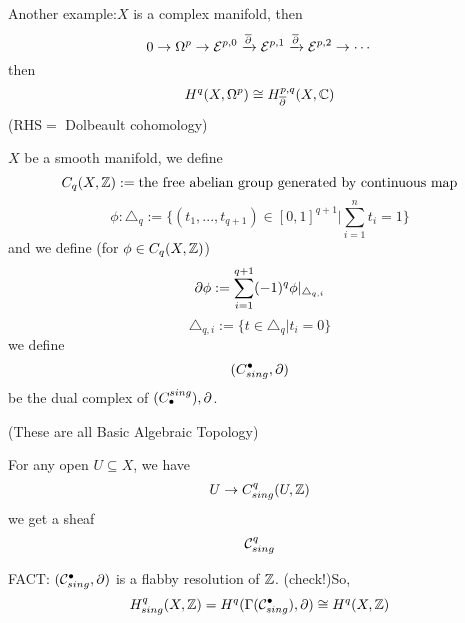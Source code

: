 Another example:$X$ is a complex manifold, then
$$0\to\Omega^p\to\mathcal{E}^{p,0}\xrightarrow{\overline{\partial}}\mathcal{E}^{p,1}\xrightarrow{\overline{\partial}}\mathcal{E}^{p,2}\to\cdots$$
then
$$H^{q}(X,\Omega^p)\cong H_{\overline{\partial}}^{p,q}(X,\mathbb{C})$$
(RHS$=$ Dolbeault cohomology)


$X$ be a smooth manifold, we define
$$C_q(X,\mathbb{Z}):=\text{the free abelian group generated by continuous map}$$
$$\phi:\triangle_q:=\{(t_1,...,t_{q+1})\in[0,1]^{q+1}|\sum_{i=1}^nt_i=1\}$$
and we define (for $\phi\in C_q(X,\mathbb{Z})$)
$$\partial\phi:=\sum_{i=1}^{q+1}(-1)^q\phi|_{\triangle_{q,i}}$$
$$\triangle_{q,i}:=\{t\in\triangle_q|t_i=0\}$$
we define
$$(C_{sing}^{\bullet},\partial)$$
be the dual complex of $(C^{sing}_{\bullet}),\partial$.

(These are all Basic Algebraic Topology)

For any open $U\subseteq X$, we have
$$U\to C_{sing}^q(U,\mathbb{Z})$$
we get a sheaf
$$\mathcal{C}_{sing}^q$$

FACT: $(\mathcal{C}_{sing}^{\bullet},\partial)$ is a flabby resolution of $\mathbb{Z}$. (check!)So,
$$H^q_{sing}(X,\mathbb{Z})= H^q(\Gamma(\mathcal{C}_{sing}^{\bullet}),\partial)
\cong H^q(X,\mathbb{Z})$$



